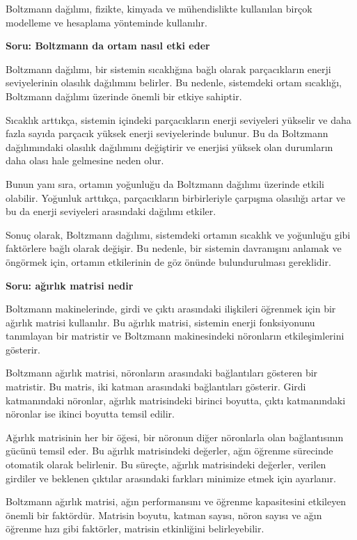 \documentclass[11pt]{article}
\begin{document}
Boltzmann dağılımı, fizikte, kimyada ve mühendislikte kullanılan birçok modelleme ve hesaplama yönteminde kullanılır.

\textbf{Soru: Boltzmann da ortam nasıl etki eder}

Boltzmann dağılımı, bir sistemin sıcaklığına bağlı olarak parçacıkların enerji seviyelerinin olasılık dağılımını belirler. Bu nedenle, sistemdeki ortam sıcaklığı, Boltzmann dağılımı üzerinde önemli bir etkiye sahiptir.

Sıcaklık arttıkça, sistemin içindeki parçacıkların enerji seviyeleri yükselir ve daha fazla sayıda parçacık yüksek enerji seviyelerinde bulunur. Bu da Boltzmann dağılımındaki olasılık dağılımını değiştirir ve enerjisi yüksek olan durumların daha olası hale gelmesine neden olur.

Bunun yanı sıra, ortamın yoğunluğu da Boltzmann dağılımı üzerinde etkili olabilir. Yoğunluk arttıkça, parçacıkların birbirleriyle çarpışma olasılığı artar ve bu da enerji seviyeleri arasındaki dağılımı etkiler.

Sonuç olarak, Boltzmann dağılımı, sistemdeki ortamın sıcaklık ve yoğunluğu gibi faktörlere bağlı olarak değişir. Bu nedenle, bir sistemin davranışını anlamak ve öngörmek için, ortamın etkilerinin de göz önünde bulundurulması gereklidir.

\textbf{Soru: ağırlık matrisi nedir}

Boltzmann makinelerinde, girdi ve çıktı arasındaki ilişkileri öğrenmek için bir ağırlık matrisi kullanılır. Bu ağırlık matrisi, sistemin enerji fonksiyonunu tanımlayan bir matristir ve Boltzmann makinesindeki nöronların etkileşimlerini gösterir.

Boltzmann ağırlık matrisi, nöronların arasındaki bağlantıları gösteren bir matristir. Bu matris, iki katman arasındaki bağlantıları gösterir. Girdi katmanındaki nöronlar, ağırlık matrisindeki birinci boyutta, çıktı katmanındaki nöronlar ise ikinci boyutta temsil edilir.

Ağırlık matrisinin her bir öğesi, bir nöronun diğer nöronlarla olan bağlantısının gücünü temsil eder. Bu ağırlık matrisindeki değerler, ağın öğrenme sürecinde otomatik olarak belirlenir. Bu süreçte, ağırlık matrisindeki değerler, verilen girdiler ve beklenen çıktılar arasındaki farkları minimize etmek için ayarlanır.

Boltzmann ağırlık matrisi, ağın performansını ve öğrenme kapasitesini etkileyen önemli bir faktördür. Matrisin boyutu, katman sayısı, nöron sayısı ve ağın öğrenme hızı gibi faktörler, matrisin etkinliğini belirleyebilir.
\end{document}
